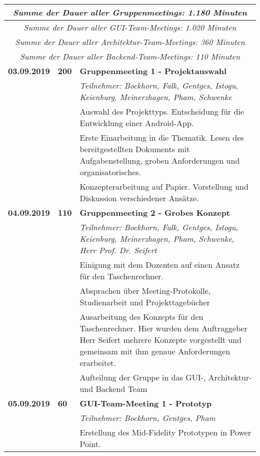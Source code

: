 {{\begin{longtable}{|l|l|p{11cm}|}
	\multicolumn{3}{|c|}{\textit{Summe der Dauer aller Gruppenmeetings: 1.180 Minuten}}
	\\ \hline\hline
	\multicolumn{3}{|c|}{\textit{Summe der Dauer aller GUI-Team-Meetings: 1.020 Minuten}}
	\\ \hline\hline
	\multicolumn{3}{|c|}{\textit{Summe der Dauer aller Architektur-Team-Meetings: 360 Minuten}}
	\\ \hline\hline
	\multicolumn{3}{|c|}{\textit{Summe der Dauer aller Backend-Team-Meetings: 110 Minuten}}
	\\ \hline
	\endlastfoot
	
		\textbf{03.09.2019} 
			& \hfill\textbf{200} & \textbf{Gruppenmeeting 1 - Projektauswahl}
			\\ & &
			\small{\textit{Teilnehmer: Bockhorn, Falk, Gentges, Istogu, Keienburg, Meinerzhagen, Pham, Schwenke}}
			\\ & &
			Auswahl des Projekttyps. Entscheidung für die Entwicklung einer Android-App.
			\\ & &
			Erste Einarbeitung in die Thematik. Lesen des bereitgestellten Dokuments mit Aufgabenstellung, groben Anforderungen und organisatorisches. 
			\\ & &
			Konzepterarbeitung auf Papier. Vorstellung und Diskussion verschiedener Ansätze.
	\\\hline
		\textbf{04.09.2019} 
			& \textbf{\hfill110} & \textbf{Gruppenmeeting 2 - Grobes Konzept}
			\\ & &
			\small{\textit{Teilnehmer: Bockhorn, Falk, Gentges, Istogu, Keienburg, Meinerzhagen, Pham, Schwenke, Herr Prof. Dr. Seifert}}
			\\ & &
			Einigung mit dem Dozenten auf einen Ansatz für den Taschenrechner.
			\\ & &
			Absprachen über Meeting-Protokolle, Studienarbeit und Projekttagebücher
			\\ & &
			Ausarbeitung des Konzepts für den Taschenrechner. Hier wurden dem Auftraggeber Herr Seifert mehrere Konzepte vorgestellt und gemeinsam mit ihm genaue Anforderungen erarbeitet.
			\\ & &
			Aufteilung der Gruppe in das GUI-, Architektur- und Backend Team
	\\\hline
		\textbf{05.09.2019} 
			& \textbf{\hfill60} & \textbf{GUI-Team-Meeting 1 - Prototyp} 
			\\ & &
			\small{\textit{Teilnehmer: Bockhorn, Gentges, Pham}}
			\\ & &
			Erstellung des Mid-Fidelity Prototypen in Power Point.			

\end{longtable}}}
